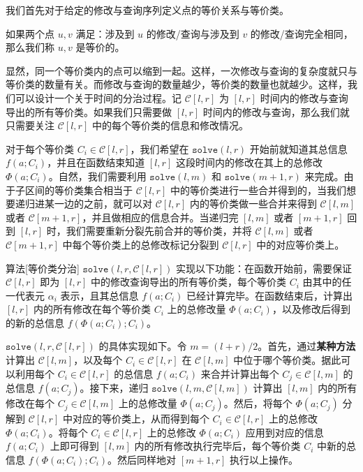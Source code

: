 我们首先对于给定的修改与查询序列定义点的等价关系与等价类。

\begin{definition}[等价关系与等价类]
    如果两个点 $u,v$ 满足：涉及到 $u$ 的修改/查询与涉及到 $v$ 的修改/查询完全相同，那么我们称 $u,v$ 是等价的。
\end{definition}

显然，同一个等价类内的点可以缩到一起。这样，一次修改与查询的复杂度就只与等价类的数量有关。而修改与查询的数量越少，等价类的数量也就越少。这样，我们可以设计一个关于时间的分治过程。记 $\mathcal C[l,r]$ 为 $[l,r]$ 时间内的修改与查询导出的所有等价类。如果我们只需要做 $[l,r]$ 时间内的修改与查询，那么我们就只需要关注 $\mathcal C[l,r]$ 中的每个等价类的信息和修改情况。

对于每个等价类 $C_i\in \mathcal C[l,r]$，我们希望在 $\mathtt{solve}(l,r)$ 开始前就知道其总信息 $f(a;C_i)$，并且在函数结束知道 $[l,r]$ 这段时间内的修改在其上的总修改 $\Phi(a;C_i)$。自然，我们需要利用 $\mathtt{solve}(l,m)$ 和 $\mathtt{solve}(m+1,r)$ 来完成。由于子区间的等价类集合相当于 $\mathcal C[l,r]$ 中的等价类进行一些合并得到的，当我们想要递归进某一边的之前，就可以对 $\mathcal C[l,r]$ 内的等价类做一些合并来得到 $\mathcal C[l,m]$ 或者 $\mathcal C[m+1,r]$，并且做相应的信息合并。当递归完 $[l,m]$ 或者 $[m+1,r]$ 回到 $[l,r]$ 时，我们需要重新分裂先前合并的等价类，并将 $\mathcal C[l,m]$ 或者 $\mathcal C[m+1,r]$ 中每个等价类上的总修改标记分裂到 $\mathcal C[l,r]$ 中的对应等价类上。 

\begin{descbox}{算法}[等价类分治]
    $\mathtt{solve}(l,r,\mathcal C[l,r])$ 实现以下功能：在函数开始前，需要保证 $\mathcal C[l,r]$ 即为 $[l,r]$ 中的修改查询导出的所有等价类，每个等价类 $C_i$ 由其中的任一代表元 $\alpha_i$ 表示，且其总信息 $f(a;C_i)$ 已经计算完毕。在函数结束后，计算出 $[l,r]$ 内的所有修改在每个等价类 $C_i$ 上的总修改量 $\Phi(a;C_i)$，以及修改后得到的新的总信息 $f(\Phi(a;C_i);C_i)$。
    
    $\mathtt{solve}(l,r,\mathcal C[l,r])$ 的具体实现如下。令 $m=(l+r)/2$。首先，通过\textbf{某种方法}计算出 $\mathcal C[l,m]$，以及每个 $C_i\in \mathcal C[l,r]$ 在 $\mathcal C[l,m]$ 中位于哪个等价类。据此可以利用每个 $C_i\in\mathcal C[l,r]$ 的总信息 $f(a;C_i)$ 来合并计算出每个 $C_j\in\mathcal C[l,m]$ 的总信息 $f(a;C_j)$。接下来，递归 $\mathtt{solve}(l,m,\mathcal C[l,m])$ 计算出 $[l,m]$ 内的所有修改在每个 $C_j\in\mathcal C[l,m]$ 上的总修改量 $\Phi(a;C_j)$。然后，将每个 $\Phi(a;C_j)$ 分解到 $\mathcal C[l,r]$ 中对应的等价类上，从而得到每个 $C_i\in \mathcal C[l,r]$ 上的总修改 $\Phi(a;C_i)$。将每个 $C_i\in\mathcal C[l,r]$ 上的总修改 $\Phi(a;C_i)$ 应用到对应的信息 $f(a;C_i)$ 上即可得到 $[l,m]$ 内的所有修改执行完毕后，每个等价类 $C_i$ 中新的总信息 $f(\Phi(a;C_i);C_i)$。然后同样地对 $[m+1,r]$ 执行以上操作。
\end{descbox}


